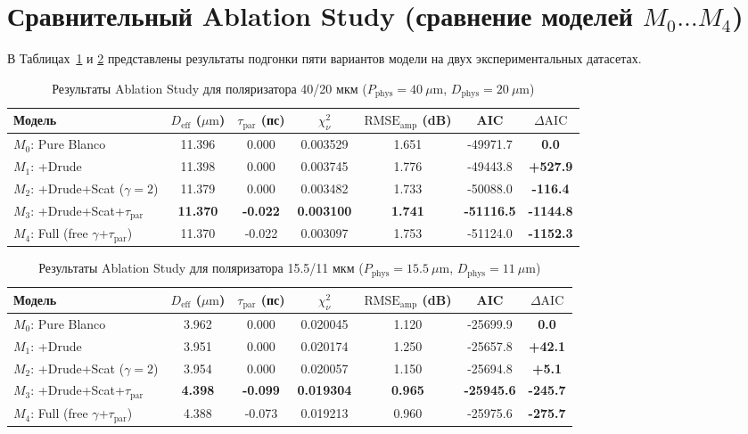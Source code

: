 \documentclass[12pt,a4paper]{article}
\begin{document}
\section{Сравнительный Ablation Study (сравнение моделей $M_0 \dots M_4$)}

В Таблицах~\ref{tab:ablation40} и \ref{tab:ablation35} представлены результаты подгонки пяти вариантов модели на двух экспериментальных датасетах.

\begin{table}[H]
\centering
\caption{Результаты Ablation Study для поляризатора 40/20 мкм ($P_{\text{phys}}=40\ \mu\text{m}$, $D_{\text{phys}}=20\ \mu\text{m}$)}
\label{tab:ablation40}
\small
\begin{tabular}{@{}l c c c c c c@{}}
\toprule
Модель & $D_{\text{eff}}$ ($\mu\text{m}$) & $\tau_{\text{par}}$ (пс) & $\chi^2_{\nu}$ & $\text{RMSE}_{\text{amp}}$ (dB) & AIC & $\Delta\text{AIC}$ \\
\midrule
$M_0$: Pure Blanco & 11.396 & 0.000 & 0.003529 & 1.651 & -49971.7 & \textbf{0.0} \\
$M_1$: +Drude & 11.398 & 0.000 & 0.003745 & 1.776 & -49443.8 & \textbf{+527.9} \\
$M_2$: +Drude+Scat ($\gamma=2$) & 11.379 & 0.000 & 0.003482 & 1.733 & -50088.0 & \textbf{-116.4} \\
$M_3$: +Drude+Scat+$\tau_{\text{par}}$ & \textbf{11.370} & \textbf{-0.022} & \textbf{0.003100} & \textbf{1.741} & \textbf{-51116.5} & \textbf{-1144.8} \\
$M_4$: Full (free $\gamma$+$\tau_{\text{par}}$) & 11.370 & -0.022 & 0.003097 & 1.753 & -51124.0 & \textbf{-1152.3} \\
\bottomrule
\end{tabular}
\end{table}

\begin{table}[H]
\centering
\caption{Результаты Ablation Study для поляризатора 15.5/11 мкм ($P_{\text{phys}}=15.5\ \mu\text{m}$, $D_{\text{phys}}=11\ \mu\text{m}$)}
\label{tab:ablation35}
\small
\begin{tabular}{@{}l c c c c c c@{}}
\toprule
Модель & $D_{\text{eff}}$ ($\mu\text{m}$) & $\tau_{\text{par}}$ (пс) & $\chi^2_{\nu}$ & $\text{RMSE}_{\text{amp}}$ (dB) & AIC & $\Delta\text{AIC}$ \\
\midrule
$M_0$: Pure Blanco & 3.962 & 0.000 & 0.020045 & 1.120 & -25699.9 & \textbf{0.0} \\
$M_1$: +Drude & 3.951 & 0.000 & 0.020174 & 1.250 & -25657.8 & \textbf{+42.1} \\
$M_2$: +Drude+Scat ($\gamma=2$) & 3.954 & 0.000 & 0.020057 & 1.150 & -25694.8 & \textbf{+5.1} \\
$M_3$: +Drude+Scat+$\tau_{\text{par}}$ & \textbf{4.398} & \textbf{-0.099} & \textbf{0.019304} & \textbf{0.965} & \textbf{-25945.6} & \textbf{-245.7} \\
$M_4$: Full (free $\gamma$+$\tau_{\text{par}}$) & 4.388 & -0.073 & 0.019213 & 0.960 & -25975.6 & \textbf{-275.7} \\
\bottomrule
\end{tabular}
\end{table}
\end{document}

